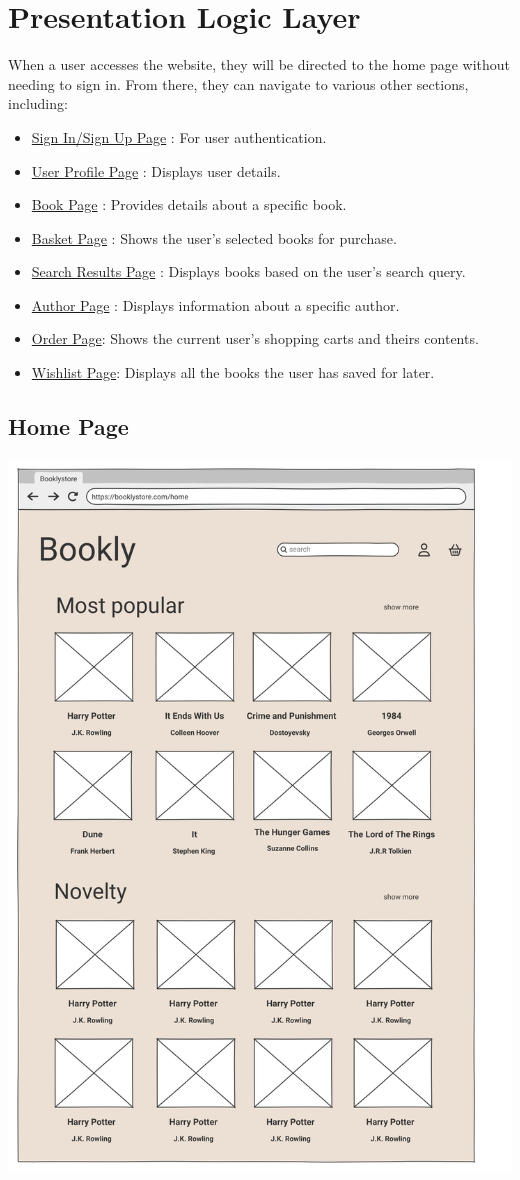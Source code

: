 \section{Presentation Logic Layer}
When a user accesses the website, they will be directed to the home page without needing to sign in. From there, they can navigate to various other sections, including:
\begin{itemize}
    \item \hyperref[sec:signin]{Sign In/Sign Up Page} : For user authentication.
    \item \hyperref[sec:profile]{User Profile Page} : Displays user details.
    \item \hyperref[sec:book]{Book Page} : Provides details about a specific book.
    \item \hyperref[sec:basket]{Basket Page} : Shows the user's selected books for purchase.
    \item \hyperref[sec:search]{Search Results Page} : Displays books based on the user’s search query.
    \item \hyperref[sec:author]{Author Page} : Displays information about a specific author.
    \item \hyperref[sec:cart]{Order Page}: Shows the current user's shopping carts and theirs contents.
    \item \hyperref[sec:wishlist]{Wishlist Page}: Displays all the books the user has saved for later.

\end{itemize}



\subsection{Home Page}

\includegraphics[width=0.6\linewidth]{HW1Report/photos/homepage.png}

